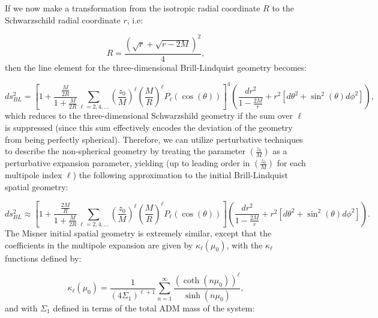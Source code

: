 \documentclass{article}
\begin{document}
If we now make a transformation from the isotropic radial coordinate $R$ to the Schwarzschild radial coordinate $r$, i.e:

\begin{equation}
R = \frac{\left( \sqrt{r} + \sqrt{r - 2M} \right)^2}{4},
\end{equation}
then the line element for the three-dimensional Brill-Lindquist geometry becomes:

\begin{equation}
d s_{BL}^{2} = \left[ 1 + \frac{\frac{M}{2R}}{1 + \frac{M}{2R}} \sum_{\ell = 2, 4, \dots} \left( \frac{z_0}{M} \right)^{\ell} \left( \frac{M}{R} \right)^{\ell} P_{\ell} \left( \cos \left( \theta \right) \right) \right]^4 \left( \frac{dr^2}{1 - \frac{2M}{r}} + r^2 \left[ d \theta^2 + \sin^2 \left( \theta \right) d \phi^2 \right] \right),
\end{equation}
which reduces to the three-dimensional Schwarzshild geometry if the sum over ${\ell}$ is suppressed (since this sum effectively encodes the deviation of the geometry from being perfectly spherical). Therefore, we can utilize perturbative techniques to describe the non-spherical geometry by treating the parameter ${\left( \frac{z_0}{M} \right) }$ as a perturbative expansion parameter, yielding (up to leading order in ${\left( \frac{z_0}{M} \right)}$ for each multipole index ${\ell}$) the following approximation to the initial Brill-Lindquist spatial geometry:

\begin{equation}
d s_{BL}^{2} \approx \left[ 1 + \frac{\frac{2M}{R}}{1 + \frac{M}{2R}} \sum_{\ell = 2, 4, \dots} \left( \frac{z_0}{M} \right)^{\ell} \left( \frac{M}{R} \right)^{\ell} P_{\ell} \left( \cos \left( \theta \right) \right) \right] \left( \frac{dr^2}{1 - \frac{2M}{r}} + r^2 \left[ d \theta^2 + \sin^2 \left( \theta \right) d \phi^2 \right] \right).
\end{equation}
The Misner initial spatial geometry is extremely similar, except that the coefficients in the multipole expansion are given by ${\kappa_{\ell} \left( \mu_0 \right)}$, with the ${\kappa_{\ell}}$ functions defined by:

\begin{equation}
\kappa_{\ell} \left( \mu_0 \right) = \frac{1}{\left( 4 \Sigma_1 \right)^{\ell + 1}} \sum_{n = 1}^{\infty} \frac{\left( \coth \left( n \mu_0 \right) \right)^{\ell}}{\sinh \left( n \mu_0 \right)},
\end{equation}
and with ${\Sigma_1}$ defined in terms of the total ADM mass of the system:
\end{document}
